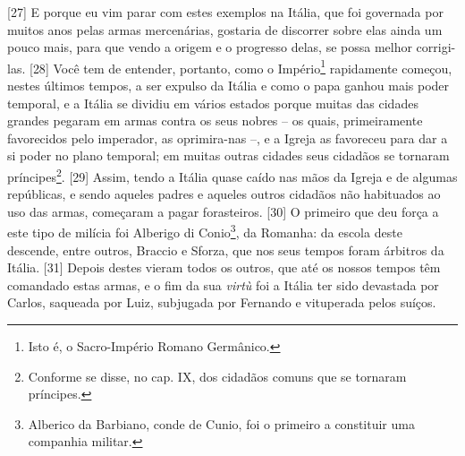 {[}27{]} E porque eu vim parar com estes exemplos na Itália, que foi
governada por muitos anos pelas armas mercenárias, gostaria de discorrer
sobre elas ainda um pouco mais, para que vendo a origem e o progresso
delas, se possa melhor corrigi-las. {[}28{]} Você tem de entender,
portanto, como o Império\footnote{Isto é, o Sacro-Império Romano
  Germânico.} rapidamente começou, nestes últimos tempos, a ser expulso
da Itália e como o papa ganhou mais poder temporal, e a Itália se
dividiu em vários estados porque muitas das cidades grandes pegaram em
armas contra os seus nobres -- os quais, primeiramente favorecidos pelo
imperador, as oprimira-nas --, e a Igreja as favoreceu para dar a si
poder no plano temporal; em muitas outras cidades seus cidadãos se
tornaram príncipes\footnote{Conforme se disse, no cap. IX, dos cidadãos
  comuns que se tornaram príncipes.}. {[}29{]} Assim, tendo a Itália
quase caído nas mãos da Igreja e de algumas repúblicas, e sendo aqueles
padres e aqueles outros cidadãos não habituados ao uso das armas,
começaram a pagar forasteiros. {[}30{]} O primeiro que deu força a este
tipo de milícia foi Alberigo di Conio\footnote{Alberico da Barbiano,
  conde de Cunio, foi o primeiro a constituir uma companhia militar.},
da Romanha: da escola deste descende, entre outros, Braccio e Sforza,
que nos seus tempos foram árbitros da Itália. {[}31{]} Depois destes
vieram todos os outros, que até os nossos tempos têm comandado estas
armas, e o fim da sua \emph{virtù} foi a Itália ter sido devastada por
Carlos, saqueada por Luiz, subjugada por Fernando e vituperada pelos
suíços.

